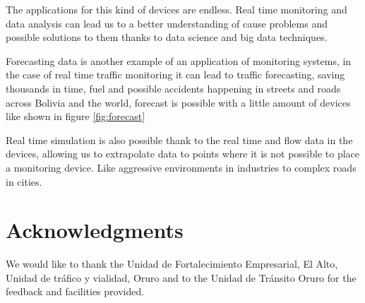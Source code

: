 \documentclass[fleqn,12pt]{SelfArx} %
\begin{document}
The applications for this kind of devices are endless. Real time monitoring and data analysis can lead us to a better understanding of cause problems and possible solutions to them thanks to data science and big data techniques.

Forecasting data is another example of an application of monitoring systems, in the case of real time traffic monitoring it can lead to traffic forecasting, saving thousands in time, fuel and possible accidents happening in streets and roads across Bolivia and the world, forecast is possible with a little amount of devices like shown in figure \ref{fig:forecast}



Real time simulation is also possible thank to the real time and flow data in the devices, allowing us to extrapolate data to points where it is not possible to place a monitoring device. Like aggressive environments in industries to complex roads in cities.

\section*{Acknowledgments} %


We would like to thank the Unidad de Fortalecimiento Empresarial, El Alto, Unidad de tráfico y vialidad, Oruro and to the Unidad de Tránsito Oruro for the feedback and facilities provided.

%
%

\end{document}
